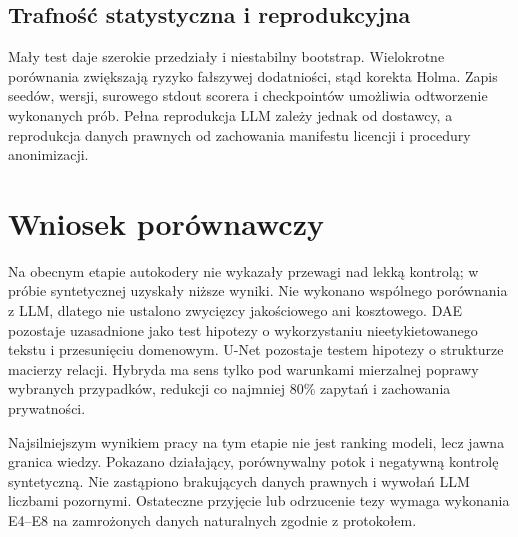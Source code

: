 \subsection{Trafność statystyczna i reprodukcyjna}

Mały test daje szerokie przedziały i niestabilny bootstrap. Wielokrotne porównania zwiększają ryzyko fałszywej dodatniości, stąd korekta Holma. Zapis seedów, wersji, surowego stdout scorera i checkpointów umożliwia odtworzenie wykonanych prób. Pełna reprodukcja LLM zależy jednak od dostawcy, a reprodukcja danych prawnych od zachowania manifestu licencji i procedury anonimizacji.

\section{Wniosek porównawczy}

Na obecnym etapie autokodery nie wykazały przewagi nad lekką kontrolą; w próbie syntetycznej uzyskały niższe wyniki. Nie wykonano wspólnego porównania z LLM, dlatego nie ustalono zwycięzcy jakościowego ani kosztowego. DAE pozostaje uzasadnione jako test hipotezy o wykorzystaniu nieetykietowanego tekstu i przesunięciu domenowym. U-Net pozostaje testem hipotezy o strukturze macierzy relacji. Hybryda ma sens tylko pod warunkami mierzalnej poprawy wybranych przypadków, redukcji co najmniej 80\% zapytań i zachowania prywatności.

Najsilniejszym wynikiem pracy na tym etapie nie jest ranking modeli, lecz jawna granica wiedzy. Pokazano działający, porównywalny potok i negatywną kontrolę syntetyczną. Nie zastąpiono brakujących danych prawnych i wywołań LLM liczbami pozornymi. Ostateczne przyjęcie lub odrzucenie tezy wymaga wykonania E4--E8 na zamrożonych danych naturalnych zgodnie z protokołem.
